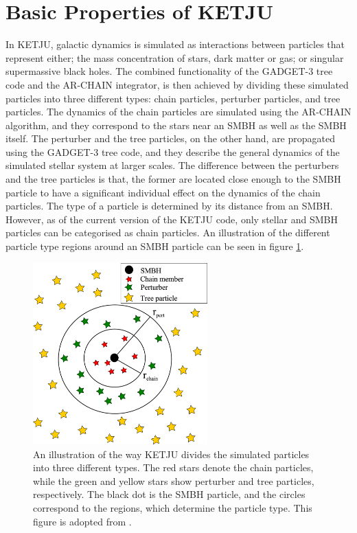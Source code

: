 \documentclass[english, twoside]{HYgradu}
\begin{document}

\section{Basic Properties of KETJU}

In KETJU, galactic dynamics is simulated as interactions between particles that represent either; the mass concentration of stars, dark matter or gas; or singular supermassive black holes. The combined functionality of the GADGET-3 tree code and the AR-CHAIN integrator, is then achieved by dividing these simulated particles into three different types: chain particles, perturber particles, and tree particles. The dynamics of the chain particles are simulated using the AR-CHAIN algorithm, and they correspond to the stars near an SMBH as well as the SMBH itself. The perturber and the tree particles, on the other hand, are propagated using the GADGET-3 tree code, and they describe the general dynamics of the simulated stellar system at larger scales. The difference between the perturbers and the tree particles is that, the former are located close enough to the SMBH particle to have a significant individual effect on the dynamics of the chain particles. The type of a particle is determined by its distance from an SMBH. However, as of the current version of the KETJU code, only stellar and SMBH particles can be categorised as chain particles. An illustration of the different particle type regions around an SMBH particle can be seen in figure \ref{figure:ketju_regions_illustration}.

\begin{figure}
	\centering	
	\includegraphics[width=0.6\textwidth]{rantala2017.jpg}	
	\caption{An illustration of the way KETJU divides the simulated particles into three different types. The red stars denote the chain particles, while the green and yellow stars show perturber and tree particles, respectively. The black dot is the SMBH particle, and the circles correspond to the regions, which determine the particle type. This figure is adopted from \cite{Rantala2017KETJU}.}
	\label{figure:ketju_regions_illustration}
\end{figure}
\end{document}

